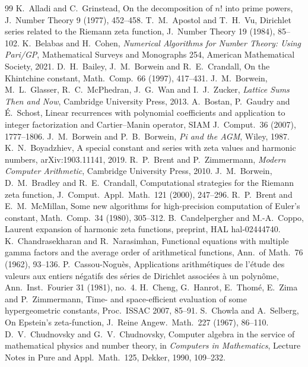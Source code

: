 \documentclass[11pt,reqno]{amsart}
\theoremstyle{definition}
\theoremstyle{remark}
\begin{document}
\begin{thebibliography}{99}
 K.~Alladi and C.~Grinstead, On the decomposition of $n!$ into prime powers, J.\ Number Theory 9 (1977), 452--458.
 T.~M.~Apostol and T.~H.~Vu, Dirichlet series related to the Riemann zeta function, J.\ Number Theory 19 (1984), 85--102.
 K.~Belabas and H.~Cohen, \emph{Numerical Algorithms for Number Theory: Using Pari/GP}, Mathematical Surveys and Monographs 254, American Mathematical Society, 2021.
 D.~H.~Bailey, J.~M.~Borwein and R.~E.~Crandall, On the Khintchine constant, Math.\ Comp.\ 66 (1997), 417--431.
 J.~M.~Borwein, M.~L.~Glasser, R.~C.~McPhedran, J.~G.~Wan and I.~J.~Zucker, \emph{Lattice Sums Then and Now}, Cambridge University Press, 2013.
 A.~Bostan, P.~Gaudry and \'E.~Schost, Linear recurrences with polynomial coefficients and application to integer factorization and Cartier--Manin operator, SIAM J.\ Comput.\ 36 (2007), 1777--1806.
 J.~M.~Borwein and P.~B.~Borwein, \emph{Pi and the AGM}, Wiley, 1987.
 K.~N.~Boyadzhiev, A special constant and series with zeta values and harmonic numbers, arXiv:1903.11141, 2019.
 R.~P.~Brent and P.~Zimmermann, \emph{Modern Computer Arithmetic}, Cambridge University Press, 2010.
 J.~M.~Borwein, D.~M.~Bradley and R.~E.~Crandall, Computational strategies for the Riemann zeta function, J.\ Comput.\ Appl.\ Math.\ 121 (2000), 247--296.
 R.~P.~Brent and E.~M.~McMillan, Some new algorithms for high-precision computation of Euler's constant, Math.\ Comp.\ 34 (1980), 305--312.
 B.~Candelpergher and M.-A.~Coppo, Laurent expansion of harmonic zeta functions, preprint, HAL hal-02444740.
 K.~Chandrasekharan and R.~Narasimhan, Functional equations with multiple gamma factors and the average order of arithmetical functions, Ann.\ of Math.\ 76 (1962), 93--136.
 P.~Cassou-Nogu\`es, Applications arithm\'etiques de l'\'etude des valeurs aux entiers n\'egatifs des s\'eries de Dirichlet associ\'ees \`a un polyn\^ome, Ann.\ Inst.\ Fourier 31 (1981), no.~4.
 H.~Cheng, G.~Hanrot, E.~Thom\'e, E.~Zima and P.~Zimmermann, Time- and space-efficient evaluation of some hypergeometric constants, Proc.\ ISSAC 2007, 85--91.
 S.~Chowla and A.~Selberg, On Epstein's zeta-function, J.\ Reine Angew.\ Math.\ 227 (1967), 86--110.
 D.~V.~Chudnovsky and G.~V.~Chudnovsky, Computer algebra in the service of mathematical physics and number theory, in \emph{Computers in Mathematics}, Lecture Notes in Pure and Appl.\ Math.\ 125, Dekker, 1990, 109--232.

\end{thebibliography}
\end{document}
